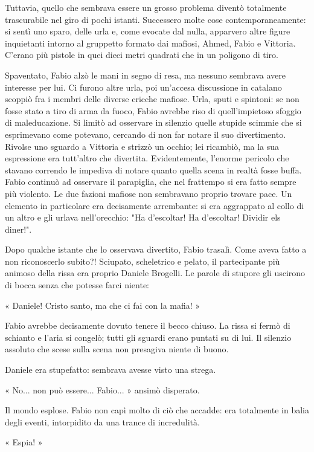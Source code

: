 Tuttavia, quello che sembrava essere un grosso problema diventò totalmente trascurabile nel giro di pochi istanti. Successero molte cose contemporaneamente: si sentì uno sparo, delle urla e, come evocate dal nulla, apparvero altre figure inquietanti intorno al gruppetto formato dai mafiosi, Ahmed, Fabio e Vittoria. C'erano più pistole in quei dieci metri quadrati che in un poligono di tiro.

Spaventato, Fabio alzò le mani in segno di resa, ma nessuno sembrava avere interesse per lui. Ci furono altre urla, poi un'accesa discussione in catalano scoppiò fra i membri delle diverse cricche mafiose. Urla, sputi e spintoni: se non fosse stato a tiro di arma da fuoco, Fabio avrebbe riso di quell'impietoso sfoggio di maleducazione. Si limitò ad osservare in silenzio quelle stupide scimmie che si esprimevano come potevano, cercando di non far notare il suo divertimento. Rivolse uno sguardo a Vittoria e strizzò un occhio; lei ricambiò, ma la sua espressione era tutt'altro che divertita. Evidentemente, l'enorme pericolo che stavano correndo le impediva di notare quanto quella scena in realtà fosse buffa. Fabio continuò ad osservare il parapiglia, che nel frattempo si era fatto sempre più violento. Le due fazioni mafiose non sembravano proprio trovare pace. Un elemento in particolare era decisamente arrembante: si era aggrappato al collo di un altro e gli urlava nell'orecchio: "Ha d'escoltar! Ha d'escoltar! Dividir els diner!".

Dopo qualche istante che lo osservava divertito, Fabio trasalì. Come aveva fatto a non riconoscerlo subito?! Sciupato, scheletrico e pelato, il partecipante più animoso della rissa era proprio Daniele Brogelli. Le parole di stupore gli uscirono di bocca senza che potesse farci niente:

« Daniele! Cristo santo, ma che ci fai con la mafia! »

Fabio avrebbe decisamente dovuto tenere il becco chiuso. La rissa si fermò di schianto e l'aria si congelò; tutti gli sguardi erano puntati su di lui. Il silenzio assoluto che scese sulla scena non presagiva niente di buono.

Daniele era stupefatto: sembrava avesse visto una strega.

« No... non può essere... Fabio... » ansimò disperato.

Il mondo esplose. Fabio non capì molto di ciò che accadde: era totalmente in balia degli eventi, intorpidito da una trance di incredulità.

« Espia! »

